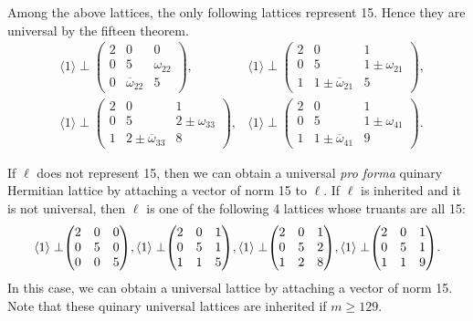 \documentclass[a4paper,10pt,reqno]{amsart}
\begin{document}
\noindent Among the above lattices, the only following lattices represent 15. Hence they are
universal by the fifteen theorem.
\begin{align*}
& {\langle {1} \rangle} \perp {\begin{pmatrix}
  2 & 0 & 0 \\
  0 & 5 & {\omega_{22}} \\
  0 & {{{{\overline{\omega}}}}_{22}} & 5
\end{pmatrix}},
& {\langle {1} \rangle} \perp {\begin{pmatrix}
  2 & 0 & 1 \\
  0 & 5 & {1\pm\omega_{21}} \\
  1 & {1\pm{{{\overline{\omega}}}}_{21}} & 5
\end{pmatrix}}, \\
& {\langle {1} \rangle} \perp {\begin{pmatrix}
  2 & 0 & 1 \\
  0 & 5 & {2\pm\omega_{33}} \\
  1 & {2\pm{{{\overline{\omega}}}}_{33}} & 8
\end{pmatrix}}, & {\langle {1} \rangle} \perp
{\begin{pmatrix}
  2 & 0 & 1 \\
  0 & 5 & {1\pm\omega_{41}} \\
  1 & {1\pm{{{\overline{\omega}}}}_{41}} & 9
\end{pmatrix}}.
\end{align*}

\noindent If $\ell$ does not represent 15, then we can obtain a universal \emph{pro forma} quinary
Hermitian lattice by attaching a vector of norm 15 to $\ell$. If $\ell$ is inherited and it is not
universal, then $\ell$ is one of the following 4 lattices whose truants are all 15:
\[
{\langle {1} \rangle} \perp \negthickspace{\begin{pmatrix}
  {2} & {0} & {0} \\
  {0} & {5} & {0} \\
  {0} & {0} & {5}
\end{pmatrix}}, {\langle {1} \rangle} \perp \negthickspace{\begin{pmatrix}
  {2} & {0} & {1} \\
  {0} & {5} & {1} \\
  {1} & {1} & {5}
\end{pmatrix}}, {\langle {1} \rangle} \perp \negthickspace{\begin{pmatrix}
  {2} & {0} & {1} \\
  {0} & {5} & {2} \\
  {1} & {2} & {8}
\end{pmatrix}}, {\langle {1} \rangle} \perp \negthickspace{\begin{pmatrix}
  {2} & {0} & {1} \\
  {0} & {5} & {1} \\
  {1} & {1} & {9}
\end{pmatrix}}.
\]
\noindent In this case, we can obtain a universal lattice by attaching a vector of norm 15. Note
that these quinary universal lattices are inherited if $m \geq 129$.
\end{document}
